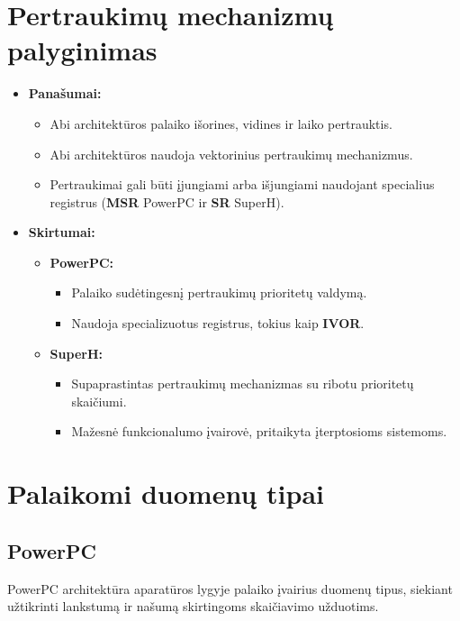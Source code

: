 \documentclass{article}
\begin{document}
\section*{Pertraukimų mechanizmų palyginimas}
\begin{itemize}
    \item \textbf{Panašumai:}
        \begin{itemize}
            \item Abi architektūros palaiko išorines, vidines ir laiko pertrauktis.
            \item Abi architektūros naudoja vektorinius pertraukimų mechanizmus.
            \item Pertraukimai gali būti įjungiami arba išjungiami naudojant specialius registrus (\textbf{MSR} PowerPC ir \textbf{SR} SuperH).
        \end{itemize}
    \item \textbf{Skirtumai:}
        \begin{itemize}
            \item \textbf{PowerPC:} 
                \begin{itemize}
                    \item Palaiko sudėtingesnį pertraukimų prioritetų valdymą.
                    \item Naudoja specializuotus registrus, tokius kaip \textbf{IVOR}.
                \end{itemize}
            \item \textbf{SuperH:}
                \begin{itemize}
                    \item Supaprastintas pertraukimų mechanizmas su ribotu prioritetų skaičiumi.
                    \item Mažesnė funkcionalumo įvairovė, pritaikyta įterptosioms sistemoms.
                \end{itemize}
        \end{itemize}
\end{itemize}

\section{Palaikomi duomenų tipai}
\subsection{PowerPC}
PowerPC architektūra aparatūros lygyje palaiko įvairius duomenų tipus, siekiant užtikrinti lankstumą ir našumą skirtingoms skaičiavimo užduotims.
\end{document}
